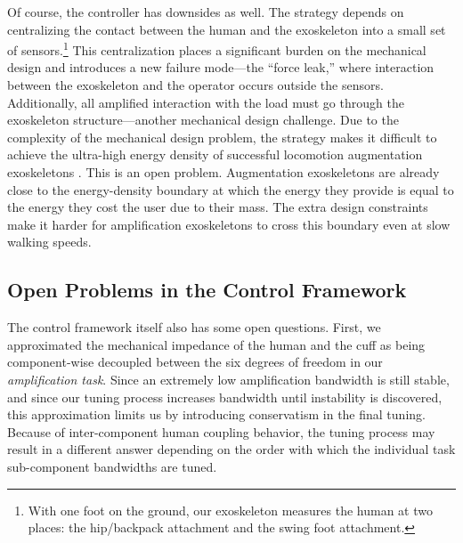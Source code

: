 \documentclass[utf8]{frontiersSCNS}
\renewcommand*{\cite}[1]{\citep{#1}}
\begin{document}
Of course, the controller has downsides as well.
The strategy depends on centralizing the contact between the human and the exoskeleton into a small set of sensors.\footnote{With one foot on the ground, our exoskeleton measures the human at two places: the hip/backpack attachment and the swing foot attachment.}
This centralization places a significant burden on the mechanical design and introduces a new failure mode---the ``force leak,'' where interaction between the exoskeleton and the operator occurs outside the sensors.
Additionally, all amplified interaction with the load must go through the exoskeleton structure---another mechanical design challenge.
Due to the complexity of the mechanical design problem, the strategy makes it difficult to achieve the ultra-high energy density of successful locomotion augmentation exoskeletons \cite{KimWalshEA2019Science,MooneyRouseHerr2014JNRE}.
This is an open problem.
Augmentation exoskeletons are already close to the energy-density boundary at which the energy they provide is equal to the energy they cost the user due to their mass.
The extra design constraints make it harder for amplification exoskeletons to cross this boundary even at slow walking speeds.



\subsection{Open Problems in the Control Framework}
\label{subs:open_control}
The control framework itself also has some open questions.
First, we approximated the mechanical impedance of the human and the cuff as being component-wise decoupled between the six degrees of freedom in our \emph{amplification task}.
Since an extremely low amplification bandwidth is still stable, and since our tuning process increases bandwidth until instability is discovered, this approximation limits us by introducing conservatism in the final tuning. %
Because of inter-component human coupling behavior, the tuning process may result in a different answer depending on the order with which the individual task sub-component bandwidths are tuned. %
\end{document}
